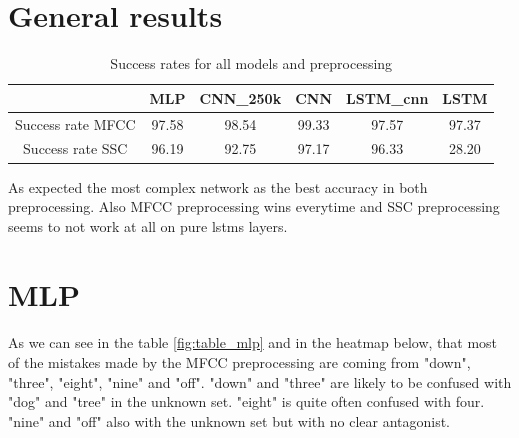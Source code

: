 \section{General results}

\begin{table}[h!]
    \centering
    \begin{tabular}{|c|c|c | c |c |c|}
        
        
        \hline
         & MLP & CNN_{250k} & CNN & LSTM_{cnn} & LSTM  \\
        \hline
        Success rate MFCC & 97.58 & 98.54 & 99.33 & 97.57 & 97.37\\
        \hline
        Success rate SSC & 96.19 & 92.75 & 97.17 & 96.33 & 28.20\\
        \hline
    \end{tabular}
    \caption{Success rates for all models and preprocessing}
    \label{tab:genera_modell}
\end{table}

As expected the most complex network as the best accuracy in both preprocessing. Also MFCC preprocessing wins everytime and SSC preprocessing seems to not work at all on pure lstms layers. 



\section{MLP}





As we can see in the table \ref{fig:table_mlp} and in the heatmap below, that most of the mistakes made by the MFCC preprocessing are coming from "down", "three", "eight", "nine" and "off". "down" and "three" are likely to be confused with "dog" and "tree" in the unknown set. "eight" is quite often confused with four. "nine" and "off" also with the unknown set but with no clear antagonist.

